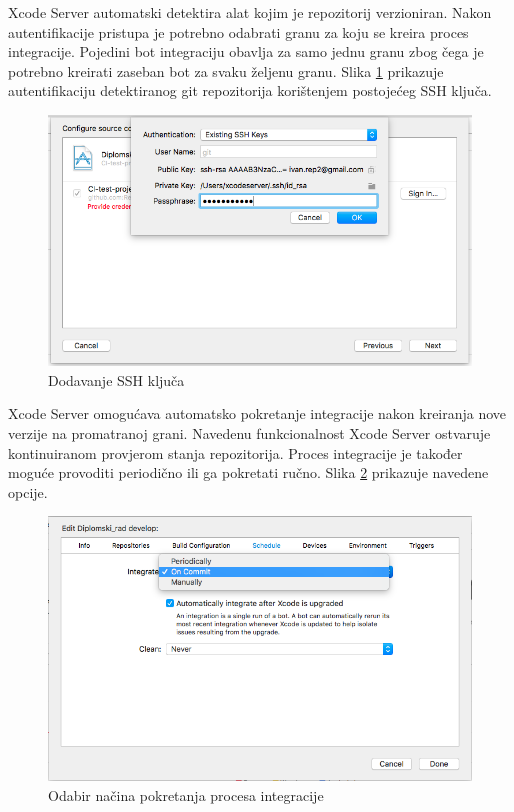 \documentclass[times, utf8, diplomski, numeric]{fer}
\begin{document}
Xcode Server automatski detektira alat kojim je repozitorij verzioniran. Nakon autentifikacije pristupa je potrebno odabrati granu za koju se kreira proces integracije. Pojedini bot integraciju obavlja za samo jednu granu zbog čega je potrebno kreirati zaseban bot za svaku željenu granu. Slika \ref{fig:BotAddingSSH} prikazuje autentifikaciju detektiranog git repozitorija korištenjem postojećeg SSH ključa.

\begin{figure}
\centering
\includegraphics[scale=0.5]{BotAddingSSH}
\caption{Dodavanje SSH ključa}
\label{fig:BotAddingSSH}
\end{figure}

Xcode Server omogućava automatsko pokretanje integracije nakon kreiranja nove verzije na promatranoj grani. Navedenu funkcionalnost Xcode Server ostvaruje kontinuiranom provjerom stanja repozitorija. Proces integracije je također moguće provoditi periodično ili ga pokretati ručno. Slika \ref{fig:CIStartConfig} prikazuje navedene opcije.

\begin{figure}[b!]
\centering
\includegraphics[scale=0.5]{CIStartConfig}
\caption{Odabir načina pokretanja procesa integracije}
\label{fig:CIStartConfig}
\end{figure}
\end{document}
